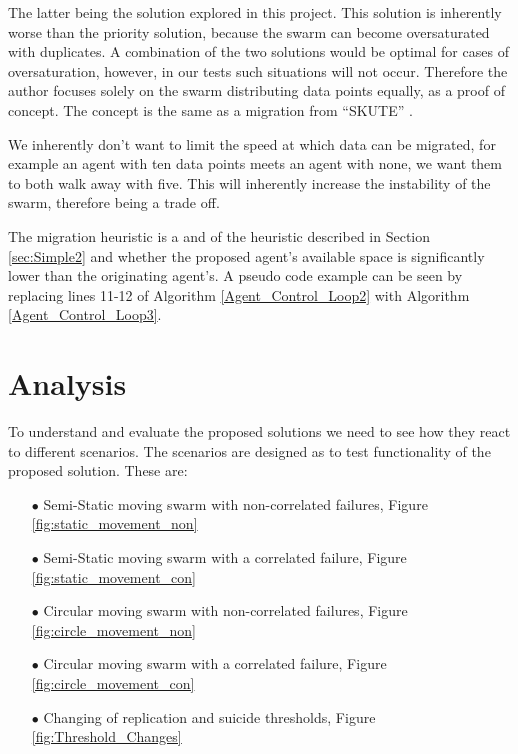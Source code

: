 \documentclass{UoYCSproject}
\begin{document}
The latter being the solution explored in this project. 
This solution is inherently worse than the priority solution, because the swarm can become oversaturated with duplicates. 
A combination of the two solutions would be optimal for cases of oversaturation, however, in our tests such situations will not occur. 
Therefore the author focuses solely on the swarm distributing data points equally, as a proof of concept. 
The concept is the same as a migration from “SKUTE” \cite{Distributed Storage}.

We inherently don’t want to limit the speed at which data can be migrated, for example an agent with ten data points meets an agent with none, we want them to both walk away with five. 
This will inherently increase the instability of the swarm, therefore being a trade off.

The migration heuristic is a and of the heuristic described in Section \ref{sec:Simple2} and whether the proposed agent's available space is significantly lower than the originating agent’s. 
A pseudo code example can be seen by replacing lines 11-12 of Algorithm \ref{Agent_Control_Loop2} with Algorithm \ref{Agent_Control_Loop3}.


\chapter{Analysis}
\label{cha:Analysis}

To understand and evaluate the proposed solutions we need to see how they react to different scenarios. 
The scenarios are designed as to test functionality of the proposed solution. 
These are:

\begin{itemize}
\itemsep-1em
\item[$\bullet$] Semi-Static moving swarm with non-correlated failures, Figure \ref{fig:static_movement_non}
\item[$\bullet$] Semi-Static moving swarm with a correlated failure, Figure \ref{fig:static_movement_con}
\item[$\bullet$] Circular moving swarm with non-correlated failures, Figure \ref{fig:circle_movement_non}
\item[$\bullet$] Circular moving swarm with a correlated failure, Figure \ref{fig:circle_movement_con}
\item[$\bullet$] Changing of replication and suicide thresholds, Figure \ref{fig:Threshold_Changes}
\end{itemize}
\end{document}

